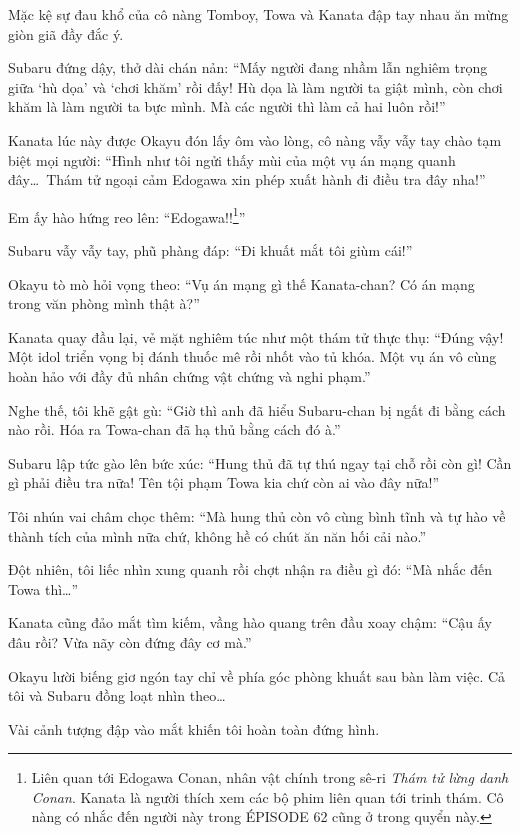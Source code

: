 \documentclass[../main.tex]{subfiles}
\begin{document}
Mặc kệ sự đau khổ của cô nàng Tomboy, Towa và Kanata đập tay nhau ăn mừng giòn giã đầy đắc ý.

Subaru đứng dậy, thở dài chán nản: ``Mấy người đang nhầm lẫn nghiêm trọng giữa `hù dọa' và `chơi khăm' rồi đấy! Hù dọa là làm người ta giật mình, còn chơi khăm là làm người ta bực mình. Mà các người thì làm cả hai luôn rồi!''

Kanata lúc này được Okayu đón lấy ôm vào lòng, cô nàng vẫy vẫy tay chào tạm biệt mọi người: ``Hình như tôi ngửi thấy mùi của một vụ án mạng quanh đây\dots\ Thám tử ngoại cảm Edogawa xin phép xuất hành đi điều tra đây nha!''

Em ấy hào hứng reo lên: ``Edogawa!!\footnote{Liên quan tới Edogawa Conan, nhân vật chính trong sê-ri \textit{Thám tử lừng danh Conan}. Kanata là người thích xem các bộ phim liên quan tới trinh thám. Cô nàng có nhắc đến người này trong {\flaregothic ÉPISODE 62} cũng ở trong quyển này.}''

Subaru vẫy vẫy tay, phũ phàng đáp: ``Đi khuất mắt tôi giùm cái!''

Okayu tò mò hỏi vọng theo: ``Vụ án mạng gì thế Kanata-chan? Có án mạng trong văn phòng mình thật à?''

Kanata quay đầu lại, vẻ mặt nghiêm túc như một thám tử thực thụ: ``Đúng vậy! Một idol triển vọng bị đánh thuốc mê rồi nhốt vào tủ khóa. Một vụ án vô cùng hoàn hảo với đầy đủ nhân chứng vật chứng và nghi phạm.''

Nghe thế, tôi khẽ gật gù: ``Giờ thì anh đã hiểu Subaru-chan bị ngất đi bằng cách nào rồi. Hóa ra Towa-chan đã hạ thủ bằng cách đó à.''

Subaru lập tức gào lên bức xúc: ``Hung thủ đã tự thú ngay tại chỗ rồi còn gì! Cần gì phải điều tra nữa! Tên tội phạm Towa kia chứ còn ai vào đây nữa!''

Tôi nhún vai châm chọc thêm: ``Mà hung thủ còn vô cùng bình tĩnh và tự hào về thành tích của mình nữa chứ, không hề có chút ăn năn hối cải nào.''

Đột nhiên, tôi liếc nhìn xung quanh rồi chợt nhận ra điều gì đó: ``Mà nhắc đến Towa thì\dots''

Kanata cũng đảo mắt tìm kiếm, vầng hào quang trên đầu xoay chậm: ``Cậu ấy đâu rồi? Vừa nãy còn đứng đây cơ mà.''

Okayu lười biếng giơ ngón tay chỉ về phía góc phòng khuất sau bàn làm việc. Cả tôi và Subaru đồng loạt nhìn theo\dots

Vài cảnh tượng đập vào mắt khiến tôi hoàn toàn đứng hình.
\end{document}
